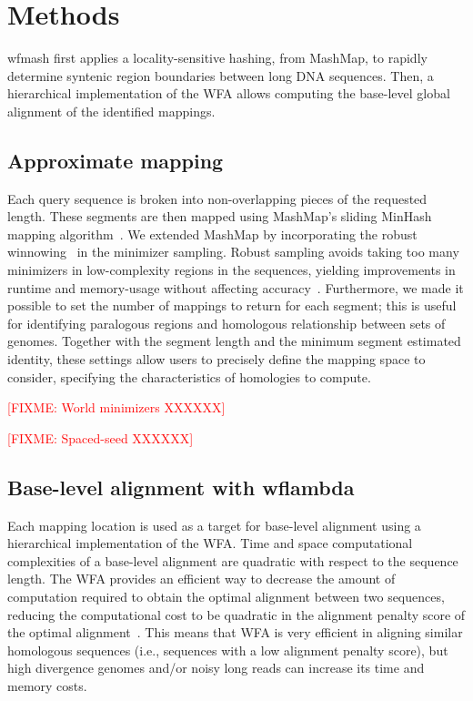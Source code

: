 \documentclass{bioinfo}
\theoremstyle{definition}
\newcommand{\red}[1]{{\textcolor{Red}{#1}}}
\newcommand{\FIXME}[1]{\red{[FIXME: #1]}}
\begin{document}
\section{Methods}
\label{sec:methods}

wfmash first applies a locality-sensitive hashing, from MashMap, to rapidly determine syntenic region boundaries between long DNA sequences.
Then, a hierarchical implementation of the WFA allows computing the base-level global alignment of the identified mappings.

\subsection{Approximate mapping}
Each query sequence is broken into non-overlapping pieces of the requested length.
These segments are then mapped using MashMap's sliding MinHash mapping algorithm~\citep{Jain_2018}.
We extended MashMap by incorporating the robust winnowing~\citep{Schleimer2003} in the minimizer sampling.
Robust sampling avoids taking too many minimizers in low-complexity regions in the sequences, yielding improvements in runtime and memory-usage without affecting accuracy~\citep{Jain_2020}.
Furthermore, we made it possible to set the number of mappings to return for each segment; this is useful for identifying paralogous regions and homologous relationship between sets of genomes.
Together with the segment length and the minimum segment estimated identity, these settings allow users to precisely define the mapping space to consider, specifying the characteristics of homologies to compute.

\FIXME{World minimizers XXXXXX}

\FIXME{Spaced-seed XXXXXX}


\subsection{Base-level alignment with wflambda}
Each mapping location is used as a target for base-level alignment using a hierarchical implementation of the WFA.
Time and space computational complexities of a base-level alignment are quadratic with respect to the sequence length.
The WFA provides an efficient way to decrease the amount of computation required to obtain the optimal alignment between two sequences, reducing the computational cost to be quadratic in the alignment penalty score of the optimal alignment~\citep{Marco_Sola_2020}.
This means that WFA is very efficient in aligning similar homologous sequences (i.e., sequences with a low alignment penalty score), but high divergence genomes and/or noisy long reads can increase its time and memory costs.
\end{document}
